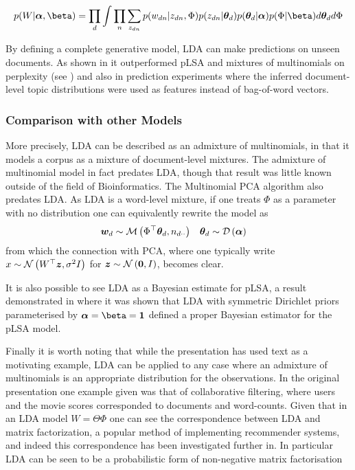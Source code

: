\begin{align}
p(W | \vv{\alpha}, \vv{\beta}) = \prod_d \int \prod_n \sum_{z_{dn}} p(w_{dn}|z_{dn}, \Phi)p(z_{dn}|\thd)p(\thd|\vv{\alpha})p(\Phi|\vv{\beta}) d\thd d\Phi
\end{align}



By defining a complete generative model, LDA can make predictions on unseen documents. As shown in \cite{BleiNgJordan2003} it outperformed pLSA and mixtures of multinomials on perplexity (see ) and also in prediction experiments where the inferred document-level topic distributions were used as features instead of bag-of-word vectors.

\subsubsection{Comparison with other Models}
More precisely, LDA can be described as an admixture of multinomials, in that it models a corpus as a mixture of document-level mixtures. The admixture of multinomial model\cite{Pritchard2000} in fact predates LDA, though that result was little known outside of the field of Bioinformatics. The Multinomial PCA algorithm\cite{Buntine2002} also predates LDA. As LDA is a word-level mixture, if one treats $\Phi$ as a parameter with no distribution one can equivalently rewrite the model as
\begin{align}
{  \bm w _d } & \sim \mathcal{M} \left( {\Phi^\top{  \bm \theta _d }},{n_{d\cdot\cdot}} \right) & { \bm \theta_d } & \sim \mathcal{D} \left( {\bm \alpha} \right)
\end{align}
from which the connection with PCA, where one typically write $x \sim \mathcal{N} \left( {W^\top\bm z}, {\sigma^2 I} \right)$ for $\bm z \sim \mathcal{N} \left( {\bm 0}, {I} \right)$, becomes clear.

It is also possible to see LDA as a Bayesian estimate for pLSA, a result demonstrated in \cite{GiKa2003} where it was shown that LDA with symmetric Dirichlet priors parameterised by $\vv{\alpha} = \vv{\beta} = \vv{1}$ defined a proper Bayesian estimator for the pLSA model. 

Finally it is worth noting that while the presentation has used text as a motivating example, LDA can be applied to any case where an admixture of multinomials is an appropriate distribution for the observations. In the original presentation\cite{BleiNgJordan2003} one example given was that of collaborative filtering, where users and the movie scores corresponded to documents and word-counts. Given that in an LDA model $W = \Theta \Phi$ one can see the correspondence between LDA and matrix factorization, a popular method of implementing recommender systems\cite{Salakhutdinov2007}, and indeed this correspondence has been investigated further in\cite{Agarwal2010}. In particular LDA can be seen to be a probabilistic form of non-negative matrix factorisation\cite{Lin2007}

